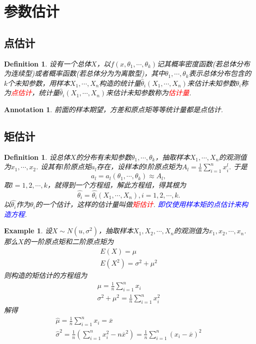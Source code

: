 \documentclass{article}
\newtheorem{example}[theorem]{Example}
\newtheorem{definition}[theorem]{Definition}
\newtheorem{annotation}[theorem]{Annotation}
\newcommand{\redt}[1]{\textcolor{red}{#1}}
\newcommand{\bluet}[1]{\textcolor{blue}{#1}}
\begin{document}
\newpage
\section{参数估计}

\subsection{点估计}

\begin{definition}
\rm 设有一个总体$X$，以$f(x,\theta_1,\cdots,\theta_k)$记其概率密度函数(若总体分布为连续型)或者概率函数(若总体分为为离散型)，其中$\theta_1,\cdots,\theta_k$表示总体分布包含的$k$个未知参数，用样本$X_1,\cdots,X_n$构造的统计量$\widehat{\theta}_i(X_1,\cdots,X_n)$来估计未知参数$\theta_i$称为\redt{点估计}，统计量$\widehat{\theta}_i(X_1,\cdots,X_n)$来估计未知参数称为\redt{估计量}.
\end{definition}

\begin{annotation}
\rm 前面的样本期望，方差和原点矩等等统计量都是点估计. 
\end{annotation}

\subsection{矩估计}

\begin{definition}
\rm 设总体$X$的分布有未知参数$\theta_1,\cdots,\theta_k$，抽取样本$X_1,\cdots,X_n$的观测值为$x_1,\cdots,x_2$. 设其有$l$阶原点矩$a_l$存在，设样本的$l$阶原点矩为$A_l = \frac{1}{n}\sum\limits_{i = 1}^n x_i ^l$. 于是
$$
a_l = a_l(\theta_1,\cdots,\theta_k) \approx A_l,
$$
取$l=1,2,\cdots,k$，就得到一个方程组，解此方程组，得其根为
$$
\widehat{\theta_i} = \widehat{\theta_i}(X_1,\cdots,X_n),i=1,2,\cdots,k.
$$
以$\widehat{\theta_i}$作为$\theta_i$的一个估计，这样的估计量叫做\redt{矩估计}. \bluet{即仅使用样本矩的点估计来构造方程}. 
\end{definition}

\begin{example}
\rm 设$X \sim N(u,\sigma^2)$，抽取样本$X_1,X_2,\cdots,X_n$的观测值为$x_1,x_2,\cdots,x_n$. 那么$X$的一阶原点矩和二阶原点矩为
$$
\begin{array}{ll}
E(X) = \mu \\
E(X^2) = \sigma^2 + \mu^2
\end{array}
$$
则构造的矩估计的方程组为
$$
\begin{array}{ll}
\mu = \frac{1}{n}\sum\limits_{i = 1}^n x_i \\
\sigma^2 + \mu^2 = \frac{1}{n}\sum\limits_{i = 1}^n x_i^2 
\end{array}
$$
解得
$$
\begin{array}{ll}
\widehat{\mu} = \frac{1}{n}\sum\limits_{i = 1}^n x_i =\overline{x} \\
\widehat{\sigma}^2 = \frac{1}{n}\left(\sum\limits_{i = 1}^n x_i^2 - n\overline{x}^2 \right) = \frac{1}{n}  \sum\limits_{i = 1}^n (x_i - \overline{x})^2
\end{array}
$$
\end{example}
\end{document}

